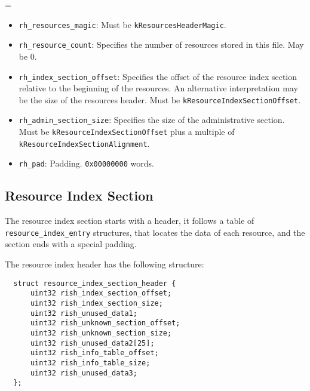 \documentclass[12pt, a4paper]{article}
\newcommand{\code}[1]{{\tt #1}}
\newenvironment{nitemize}{
  \newdimen\oldparindent
  \oldparindent=\parindent
  \begin{itemize}
  \itemindent=-\oldparindent
}{
  \end{itemize}
}
\newcommand{\codeblockbegin}{\begin{flushleft}\begin{minipage}{\textwidth}}
\newcommand{\codeblockend}{\end{minipage}\end{flushleft}}
\begin{document}
\begin{nitemize}
\item{\code{rh\_resources\_magic}:
  Must be \code{kResourcesHeaderMagic}.
}
\item{\code{rh\_resource\_count}:
  Specifies the number of resources stored in this file. May be 0.
}
\item{\code{rh\_index\_section\_offset}:
  Specifies the offset of the resource index section relative to the beginning
  of the resources. An alternative interpretation may be the size of the
  resources header.
  Must be \code{kResourceIndexSectionOffset}.
}
\item{\code{rh\_admin\_section\_size}:
  Specifies the size of the administrative section.
  Must be \code{kResourceIndexSectionOffset} plus a multiple of
  \code{kResourceIndexSectionAlignment}.
}
\item{\code{rh\_pad}:
  Padding. \code{0x00000000} words.
}
\end{nitemize}


\subsection{Resource Index Section}
\label{resources-index}

The resource index section starts with a header, it follows a table of
\code{resource\_index\_entry} structures, that locates the data of each
resource, and the section ends with a special padding.

\noindent
The resource index header has the following structure:
%
\codeblockbegin
\begin{verbatim}
  struct resource_index_section_header {
      uint32 rish_index_section_offset;
      uint32 rish_index_section_size;
      uint32 rish_unused_data1;
      uint32 rish_unknown_section_offset;
      uint32 rish_unknown_section_size;
      uint32 rish_unused_data2[25];
      uint32 rish_info_table_offset;
      uint32 rish_info_table_size;
      uint32 rish_unused_data3;
  };
\end{verbatim}
\codeblockend
\end{document}
